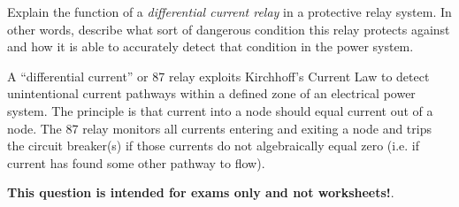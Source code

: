 

Explain the function of a {\it differential current relay} in a protective relay system.  In other words, describe what sort of dangerous condition this relay protects against and how it is able to accurately detect that condition in the power system.







A ``differential current'' or 87 relay exploits Kirchhoff's Current Law to detect unintentional current pathways within a defined zone of an electrical power system.  The principle is that current into a node should equal current out of a node.  The 87 relay monitors all currents entering and exiting a node and trips the circuit breaker(s) if those currents do not algebraically equal zero (i.e. if current has found some other pathway to flow).







{\bf This question is intended for exams only and not worksheets!}.



